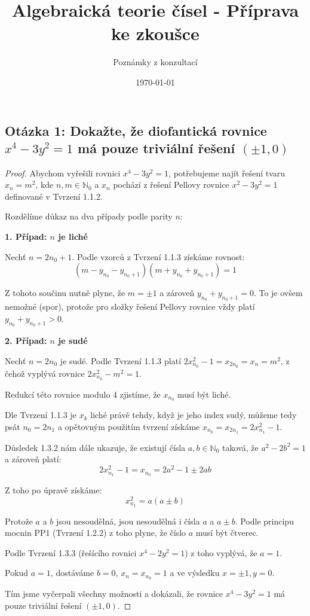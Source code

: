 \documentclass[a4paper,12pt]{article}
\title{Algebraická teorie čísel - Příprava ke zkoušce}
\author{Poznámky z konzultací}
\date{\today}
\begin{document}
\maketitle

\subsection*{Otázka 1: Dokažte, že diofantická rovnice $x^4 - 3y^2 = 1$ má pouze triviální řešení $(\pm 1, 0)$}

\begin{proof}
Abychom vyřešili rovnici $x^4 - 3y^2 = 1$, potřebujeme najít řešení tvaru $x_n = m^2$, kde $n, m \in \mathbb{N}_0$ a $x_n$ pochází z řešení Pellovy rovnice $x^2 - 3y^2 = 1$ definované v Tvrzení 1.1.2.

Rozdělíme důkaz na dva případy podle parity $n$:

\textbf{1. Případ: $n$ je liché}
\vspace{0.5em}

Nechť $n = 2n_0 + 1$. Podle vzorců z Tvrzení 1.1.3 získáme rovnost:
$$(m - y_{n_0} - y_{n_0+1})(m + y_{n_0} + y_{n_0+1}) = 1$$

Z tohoto součinu nutně plyne, že $m = \pm 1$ a zároveň $y_{n_0} + y_{n_0+1} = 0$. To je ovšem nemožné (spor), protože pro složky řešení Pellovy rovnice vždy platí $y_{n_0} + y_{n_0+1} > 0$.

\vspace{1em}
\textbf{2. Případ: $n$ je sudé}
\vspace{0.5em}

Nechť $n = 2n_0$ je sudé. Podle Tvrzení 1.1.3 platí $2x_{n_0}^2 - 1 = x_{2n_0} = x_n = m^2$, z čehož vyplývá rovnice $2x_{n_0}^2 - m^2 = 1$. 

Redukcí této rovnice modulo 4 zjistíme, že $x_{n_0}$ musí být liché. 

Dle Tvrzení 1.1.3 je $x_k$ liché právě tehdy, když je jeho index sudý, můžeme tedy psát $n_0 = 2n_1$ a opětovným použitím tvrzení získáme $x_{n_0} = x_{2n_1} = 2x_{n_1}^2 - 1$.

Důsledek 1.3.2 nám dále ukazuje, že existují čísla $a, b \in \mathbb{N}_0$ taková, že $a^2 - 2b^2 = 1$ a zároveň platí:
$$2x_{n_1}^2 - 1 = x_{n_0} = 2a^2 - 1 \pm 2ab$$

Z toho po úpravě získáme:
$$x_{n_1}^2 = a(a \pm b)$$

Protože $a$ a $b$ jsou nesoudělná, jsou nesoudělná i čísla $a$ a $a \pm b$. Podle principu mocnin PP1 (Tvrzení 1.2.2) z toho plyne, že číslo $a$ musí být čtverec. 

Podle Tvrzení 1.3.3 (řešícího rovnici $x^4 - 2y^2 = 1$) z toho vyplývá, že $a = 1$. 

Pokud $a = 1$, dostáváme $b = 0$, $x_n = x_{n_0} = 1$ a ve výsledku $x = \pm 1, y = 0$.

Tím jsme vyčerpali všechny možnosti a dokázali, že rovnice $x^4 - 3y^2 = 1$ má pouze triviální řešení $(\pm 1, 0)$.
\end{proof}
\end{document}

